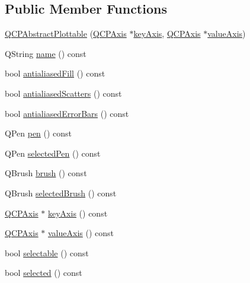 \subsection*{Public Member Functions}
\begin{DoxyCompactItemize}
\item 
\hyperlink{class_q_c_p_abstract_plottable_af78a036e40db6f53a31abadc5323715a}{Q\+C\+P\+Abstract\+Plottable} (\hyperlink{class_q_c_p_axis}{Q\+C\+P\+Axis} $\ast$\hyperlink{class_q_c_p_abstract_plottable_a72c7a09c22963f2c943f07112b311103}{key\+Axis}, \hyperlink{class_q_c_p_axis}{Q\+C\+P\+Axis} $\ast$\hyperlink{class_q_c_p_abstract_plottable_a3106f9d34d330a6097a8ec5905e5b519}{value\+Axis})
\item 
Q\+String \hyperlink{class_q_c_p_abstract_plottable_a1affc1972938e4364a9325e4e4e4dcea}{name} () const 
\item 
bool \hyperlink{class_q_c_p_abstract_plottable_a68d1c358db03faae376ec47c589abf27}{antialiased\+Fill} () const 
\item 
bool \hyperlink{class_q_c_p_abstract_plottable_aefc379bcc011660a5371ecc6088a97eb}{antialiased\+Scatters} () const 
\item 
bool \hyperlink{class_q_c_p_abstract_plottable_a630cfb27ff99ab4373b09631748fcf4a}{antialiased\+Error\+Bars} () const 
\item 
Q\+Pen \hyperlink{class_q_c_p_abstract_plottable_a41d060007cc6b3037c9c04d22d0c0398}{pen} () const 
\item 
Q\+Pen \hyperlink{class_q_c_p_abstract_plottable_a006065572c5add883a944ea4cda699f3}{selected\+Pen} () const 
\item 
Q\+Brush \hyperlink{class_q_c_p_abstract_plottable_aa74cdceb9c7286ef116fbfa58e0326e7}{brush} () const 
\item 
Q\+Brush \hyperlink{class_q_c_p_abstract_plottable_a403745791879916431adc872b49207e5}{selected\+Brush} () const 
\item 
\hyperlink{class_q_c_p_axis}{Q\+C\+P\+Axis} $\ast$ \hyperlink{class_q_c_p_abstract_plottable_a72c7a09c22963f2c943f07112b311103}{key\+Axis} () const 
\item 
\hyperlink{class_q_c_p_axis}{Q\+C\+P\+Axis} $\ast$ \hyperlink{class_q_c_p_abstract_plottable_a3106f9d34d330a6097a8ec5905e5b519}{value\+Axis} () const 
\item 
bool \hyperlink{class_q_c_p_abstract_plottable_af895574da1ec0d050711b6c9deda296a}{selectable} () const 
\item 
bool \hyperlink{class_q_c_p_abstract_plottable_ab901903adcb0e29467d63de72340ab29}{selected} () const 

\end{DoxyCompactItemize}
